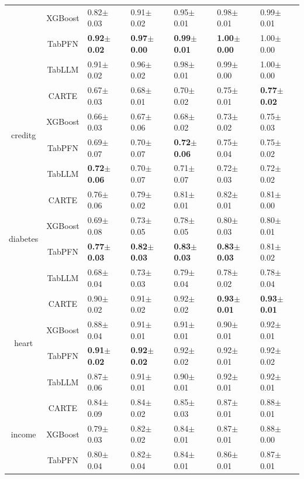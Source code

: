 \documentclass{article}
\theoremstyle{plain}
\theoremstyle{definition}
\theoremstyle{remark}
\begin{document}
\begin{table}[!p]
\begin{center}
\begin{tabular}{cclllll}
& XGBoost & 0.82$\pm$0.03 & 0.91$\pm$0.02 & 0.95$\pm$0.01 & 0.98$\pm$0.01 & 0.99$\pm$0.01 \\
& TabPFN & \textbf{0.92$\pm$0.02} & \textbf{0.97$\pm$0.00} & \textbf{0.99$\pm$0.01} & \textbf{1.00$\pm$0.00} & 1.00$\pm$0.00 \\
& TabLLM & 0.91$\pm$0.02 & 0.96$\pm$0.02 & 0.98$\pm$0.01 & 0.99$\pm$0.00 & 1.00$\pm$0.00 \\
\midrule
\multirow{4}{*}{creditg} & CARTE & 0.67$\pm$0.03 &  0.68$\pm$0.01 &   0.70$\pm$0.02 &  0.75$\pm$0.01 &  \textbf{0.77$\pm$0.02} \\
& XGBoost & 0.66$\pm$0.03 & 0.67$\pm$0.06 & 0.68$\pm$0.02 & 0.73$\pm$0.02 & 0.75$\pm$0.03 \\
& TabPFN & 0.69$\pm$0.07 & 0.70$\pm$0.07 & \textbf{0.72$\pm$0.06} & 0.75$\pm$0.04 & 0.75$\pm$0.02 \\
& TabLLM & \textbf{0.72$\pm$0.06} & 0.70$\pm$0.07 & 0.71$\pm$0.07 & 0.72$\pm$0.03 & 0.72$\pm$0.02 \\
\midrule
\multirow{4}{*}{diabetes} & CARTE & 0.76$\pm$0.06 &  0.79$\pm$0.02 &  0.81$\pm$0.01 &  0.82$\pm$0.01 &   0.81$\pm$0.00 \\
& XGBoost & 0.69$\pm$0.08 & 0.73$\pm$0.05 & 0.78$\pm$0.05 & 0.80$\pm$0.03 & 0.80$\pm$0.01 \\
& TabPFN & \textbf{0.77$\pm$0.03} & \textbf{0.82$\pm$0.03} & \textbf{0.83$\pm$0.03} & \textbf{0.83$\pm$0.03} & 0.81$\pm$0.02 \\
& TabLLM & 0.68$\pm$0.04 & 0.73$\pm$0.03 & 0.79$\pm$0.04 & 0.78$\pm$0.02 & 0.78$\pm$0.04 \\
\midrule
\multirow{4}{*}{heart} & CARTE &  0.90$\pm$0.02 &  0.91$\pm$0.02 &  0.92$\pm$0.02 &  \textbf{0.93$\pm$0.01} &  \textbf{0.93$\pm$0.01} \\
& XGBoost & 0.88$\pm$0.04 & 0.91$\pm$0.01 & 0.91$\pm$0.01 & 0.90$\pm$0.01 & 0.92$\pm$0.01 \\
& TabPFN & \textbf{0.91$\pm$0.02} & \textbf{0.92$\pm$0.02} & 0.92$\pm$0.02 & 0.92$\pm$0.01 & 0.92$\pm$0.02 \\
& TabLLM & 0.87$\pm$0.06 & 0.91$\pm$0.01 & 0.90$\pm$0.01 & 0.92$\pm$0.01 & 0.92$\pm$0.01 \\
\midrule
\multirow{4}{*}{income} & CARTE & 0.84$\pm$0.09 &  0.84$\pm$0.02 &  0.85$\pm$0.03 &  0.87$\pm$0.01 &  0.88$\pm$0.01 \\
& XGBoost & 0.79$\pm$0.03 & 0.82$\pm$0.02 & 0.84$\pm$0.01 & 0.87$\pm$0.01 & 0.88$\pm$0.00 \\
& TabPFN & 0.80$\pm$0.04 & 0.82$\pm$0.04 & 0.84$\pm$0.01 & 0.86$\pm$0.01 & 0.87$\pm$0.01 \\

\end{tabular}
\end{center}
\end{table}
\end{document}
